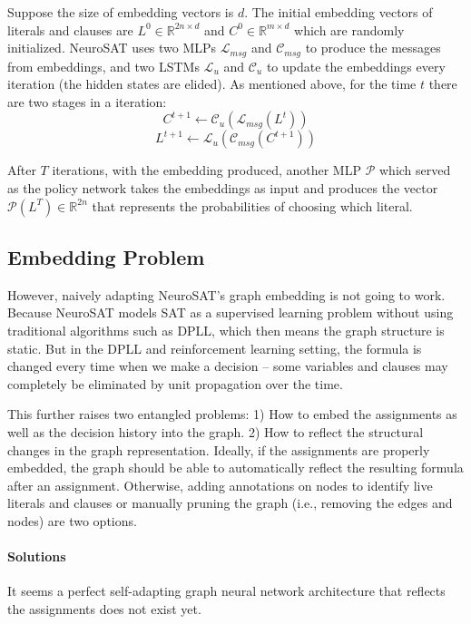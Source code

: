 \documentclass[sigplan,10pt]{acmart}\settopmatter{printfolios=true,printccs=false,printacmref=false}
\begin{document}
Suppose the size of embedding vectors is $d$. The initial embedding vectors of literals and clauses 
are $L^{0} \in \mathbb{R}^{2n \times d}$ and $C^{0} \in \mathbb{R}^{m \times d}$ which are randomly initialized.
NeuroSAT uses two MLPs $\mathcal{L}_{msg}$ and $\mathcal{C}_{msg}$ to produce the messages from embeddings, 
and two LSTMs $\mathcal{L}_u$ and $\mathcal{C}_u$ to update the embeddings every iteration 
(the hidden states are elided). 
As mentioned above, for the time $t$ there are two stages in a iteration:
$$ C^{t+1} \leftarrow \mathcal{C}_u( \mathcal{L}_{msg}(L^t) ) $$
$$ L^{t+1} \leftarrow \mathcal{L}_u( \mathcal{C}_{msg}(C^{t+1}) ) $$

After $T$ iterations, with the embedding produced, another MLP $\mathcal{P}$ which served as the policy network takes 
the embeddings as input and produces the vector $\mathcal{P}(L^T) \in \mathbb{R}^{2n}$ that represents the probabilities of choosing which literal.

\subsection{Embedding Problem}

However, naively adapting NeuroSAT's graph embedding is not going to work.
Because NeuroSAT models SAT as a supervised learning problem without using traditional algorithms 
such as DPLL, which then means the graph structure is static. 
But in the DPLL and reinforcement learning setting, the formula is changed every time when we make a decision --
some variables and clauses may completely be eliminated by unit propagation over the time.

This further raises two entangled problems:
1) How to embed the assignments as well as the decision history into the graph.
2) How to reflect the structural changes in the graph representation. Ideally, if the assignments are properly 
embedded, the graph should be able to automatically reflect the resulting formula after an assignment. 
Otherwise, adding annotations on nodes to identify live literals and clauses or manually pruning the graph 
(i.e., removing the edges and nodes) are two options.

\paragraph{Solutions}

It seems a perfect self-adapting graph neural network architecture that reflects the assignments
does not exist yet. 
\end{document}
